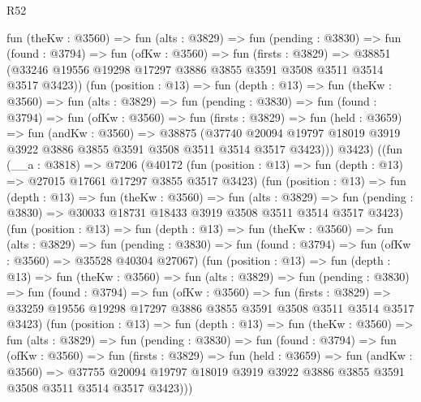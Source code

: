 \begin{lexlean}{R52}
\begin{coremodule}
          fun (theKw : @3560) =>
          fun (alts : @3829) =>
          fun (pending : @3830) =>
          fun (found : @3794) =>
          fun (ofKw : @3560) =>
          fun (firsts : @3829) =>
          @38851 (@33246 @19556 @19298 @17297 @3886 @3855 @3591 @3508 @3511 @3514 @3517 @3423))
          (fun (position : @13) =>
          fun (depth : @13) =>
          fun (theKw : @3560) =>
          fun (alts : @3829) =>
          fun (pending : @3830) =>
          fun (found : @3794) =>
          fun (ofKw : @3560) =>
          fun (firsts : @3829) =>
          fun (held : @3659) =>
          fun (andKw : @3560) =>
          @38875
            (@37740
              @20094
              @19797
              @18019
              @3919
              @3922
              @3886
              @3855
              @3591
              @3508
              @3511
              @3514
              @3517
              @3423)))
          @3423)
        ((fun (__a : @3818) =>
        @7206
          (@40172
            (fun (position : @13) => fun (depth : @13) => @27015 @17661 @17297 @3855 @3517 @3423)
            (fun (position : @13) =>
            fun (depth : @13) =>
            fun (theKw : @3560) =>
            fun (alts : @3829) =>
            fun (pending : @3830) => @30033 @18731 @18433 @3919 @3508 @3511 @3514 @3517 @3423)
            (fun (position : @13) =>
            fun (depth : @13) =>
            fun (theKw : @3560) =>
            fun (alts : @3829) =>
            fun (pending : @3830) =>
            fun (found : @3794) => fun (ofKw : @3560) => @35528 @40304 @27067)
            (fun (position : @13) =>
            fun (depth : @13) =>
            fun (theKw : @3560) =>
            fun (alts : @3829) =>
            fun (pending : @3830) =>
            fun (found : @3794) =>
            fun (ofKw : @3560) =>
            fun (firsts : @3829) =>
            @33259 @19556 @19298 @17297 @3886 @3855 @3591 @3508 @3511 @3514 @3517 @3423)
            (fun (position : @13) =>
            fun (depth : @13) =>
            fun (theKw : @3560) =>
            fun (alts : @3829) =>
            fun (pending : @3830) =>
            fun (found : @3794) =>
            fun (ofKw : @3560) =>
            fun (firsts : @3829) =>
            fun (held : @3659) =>
            fun (andKw : @3560) =>
            @37755
              @20094
              @19797
              @18019
              @3919
              @3922
              @3886
              @3855
              @3591
              @3508
              @3511
              @3514
              @3517
              @3423)))

\end{coremodule}
\end{lexlean}
